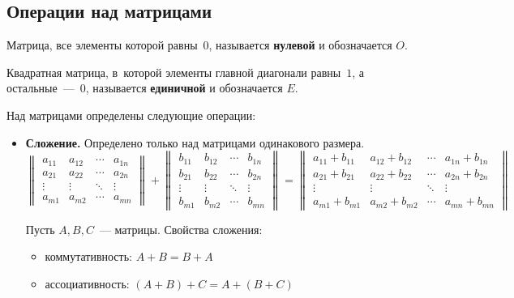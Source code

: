 \subsection{Операции над матрицами}
Матрица, все элементы которой равны~$0$, называется \textbf{нулевой} и обозначается $O$.

Квадратная матрица, в~которой элементы главной диагонали равны~$1$, а остальные~---~$0$, называется \textbf{единичной} и обозначается $E$.

Над матрицами определены следующие операции:
\begin{itemize}
	\item\textbf{Сложение.}
	Определено только над матрицами одинакового размера.
	\begin{equation*}
	\begin{Vmatrix}
	a_{11} & a_{12} & \cdots & a_{1n} \\ 
	a_{21} & a_{22} & \cdots & a_{2n} \\ 
	\vdots & \vdots & \ddots & \vdots \\ 
	a_{m1} & a_{m2} & \cdots & a_{mn}
	\end{Vmatrix} +
	\begin{Vmatrix}
	b_{11} & b_{12} & \cdots & b_{1n} \\ 
	b_{21} & b_{22} & \cdots & b_{2n} \\ 
	\vdots & \vdots & \ddots & \vdots \\ 
	b_{m1} & b_{m2} & \cdots & b_{mn}
	\end{Vmatrix} =
	\begin{Vmatrix}
	a_{11} + b_{11} & a_{12} + b_{12} & \cdots & a_{1n} + b_{1n} \\ 
	a_{21} + b_{21} & a_{22} + b_{22} & \cdots & a_{2n} + b_{2n} \\ 
	\vdots & \vdots & \ddots & \vdots \\ 
	a_{m1} + b_{m1} & a_{m2} + b_{m2} & \cdots & a_{mn} + b_{mn}
	\end{Vmatrix}
	\end{equation*}
	
	Пусть $A, B, C$~--- матрицы. Свойства сложения:
	\begin{itemize}
		\item коммутативность:
		$A + B = B + A$
		\item ассоциативность:
		$(A + B) + C = A + (B + C)$
	\end{itemize}
	

\end{itemize}
